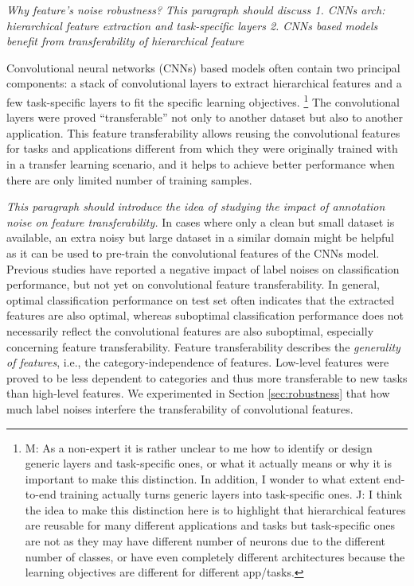 
\noindent
\textit{Why feature's noise robustness?
This paragraph should discuss
1. CNNs arch: hierarchical feature extraction and task-specific layers
2. CNNs based models benefit from transferability of hierarchical feature}

\noindent
Convolutional neural networks (CNNs) based models often contain two principal components: a stack of convolutional layers to extract hierarchical features and a few task-specific layers to fit the specific learning objectives.
\footnote{M: As a non-expert it is rather unclear to me how to identify or design generic layers and task-specific ones, or what it actually means or why it is important to make this distinction.  In addition, I wonder to what extent end-to-end training actually turns generic layers into task-specific ones. J: I think the idea to make this distinction here is to highlight that hierarchical features are reusable for many different applications and tasks but task-specific ones are not as they may have different number of neurons due to the different number of classes, or have even completely different architectures because the learning objectives are different for different app/tasks.}
The convolutional layers were proved ``transferable'' not only to another dataset\cite{yosinski2014transferable} but also to another application\cite{girshick2014rich,long2015fully}.
This feature transferability allows reusing the convolutional features for tasks and applications different from which they were originally trained with in a transfer learning scenario, and it helps to achieve better performance when there are only limited number of training samples\cite{long2015fully}.

\noindent \textit{This paragraph should introduce the idea of studying the impact of annotation noise on feature transferability.}
\noindent
In cases where only a clean but small dataset is available, an extra noisy but large dataset in a similar domain might be helpful as it can be used to pre-train the convolutional features of the CNNs model.
Previous studies\cite{sukhbaatar2014training,patrini2016making} have reported a negative impact of label noises on classification performance, but not yet on convolutional feature transferability.
In general, optimal classification performance on test set often indicates that the extracted features are also optimal, whereas suboptimal classification performance does not necessarily reflect the convolutional features are also suboptimal, especially concerning feature transferability.
Feature transferability describes the \textit{generality of features}, i.e., the category-independence of features.
Low-level features were proved to be less dependent to categories and thus more transferable to new tasks than high-level features. \cite{yosinski2014transferable}
We experimented in Section \ref{sec:robustness} that how much label noises interfere the transferability of convolutional features.

